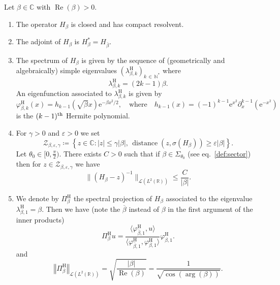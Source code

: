 \documentclass[AHL,Unicode,longabstracts,published]{cedram}
\newcommand{\abs}[1]{\left\vert #1\right\vert}
\newcommand{\nr}[1]{\left\Vert #1\right\Vert}
\renewcommand{\leq}{\leqslant}
\renewcommand{\geq}{\geqslant}
\newcommand{\inv}{^{-1}}
\newcommand{\1}{\mathds 1}
\DeclareMathOperator{\Ree}{Re}
\DeclareMathOperator{\distance}{distance}
\newcommand{\R}{\mathbb{R}}
\newcommand{\C}{\mathbb{C}}
\newcommand{\N}{\mathbb{N}}
\newcommand{\Lc}{{\mathcal L}}
\newcommand{\Zc}{\mathcal Z}
\newcommand{\eu}{\mathrm e}
\newcommand{\He}{h}
\newcommand{\sector}[1][\theta_0]{\Sigma_{#1}}
\newcommand{\h}{{\mathrm{H}}}
\renewcommand{\b}{\beta}
\newcommand{\g}{\gamma}
\newcommand{\e}{\varepsilon}
\renewcommand{\th}{\theta}
\renewcommand{\l}{\lambda}
\newcommand{\f}{\varphi}
\newcommand*{\romanenumi}{\renewcommand*{\theenumi}{\roman{enumi}}}
\DeclareMathOperator{\Ree}{Re}
\begin{document}
\break
\begin{prop}\label{prop:Davies}
Let $\b \in \C$ with $\Ree(\b) > 0$.
\begin{enumerate}\romanenumi
\item The operator $H_\b$ is closed and has compact resolvent.


\item The adjoint of $H_\b$ is $H_\b^* = H_{\bar \b}$.

\item The spectrum of $H_\beta$ is given by the sequence of (geometrically and algebraically) simple eigenvalues $(\l_{\b,k}^\h)_{k\,\in\,\N^*}$ where
\[
\l_{\b,k}^\h = (2k-1) \beta.
\]
An eigenfunction associated to $\l_{\b,k}^\h$ is given by
\[
\f_{\b,k}^\h(x) = \He_{k-1}\left(\sqrt \b x\right)\eu^{-\b x^2\!/2}, \quad \text{where} \quad \He_{k-1}(x) = (-1)^{k-1}\eu^{x^2}\partial_x^{k-1}\left(\eu^{-x^2}\right)
\]
is the $(k-1)^{\rm th}$ Hermite polynomial.

\item For $\g > 0$ and $\e > 0$ we set
\begin{equation}\label{def:Zc-beta}
\Zc_{\b,\e,\g} \coloneqq \left\{ z \in \C \colon \abs z \leq \g \abs \beta, \, \distance (z,\sigma(H_\beta)) \geq \e \abs \b\right\}.
\end{equation}
Let $\th_0 \in [0,\frac \pi 2)$. There exists $C > 0$ such that if $\beta \in \sector$ (see eq.~\eqref{def:sector}) then for $z \in \Zc_{\b,\e,\g}$ we have
\begin{equation}\label{eq:res-Hb}
\big\| \left(H_\beta - z\right)\inv \big\|_{\Lc\left(L^2(\R)\right)} \leq \frac C {\abs \beta}.
\end{equation}

\item We denote by $\Pi_{\b}^\h$ the spectral projection of $H_\b$ associated to the eigenvalue $\l_{\b,1}^\h = \b$. Then we have (note the $\overline \beta$ instead of $\beta$ in the first argument of the inner products)
\begin{equation}\label{eq:eigenproj-Hb-formula}
\Pi_\b^\h u = \frac {\big\langle \f_{\bar \b,1}^\h,u \big\rangle} {\big\langle \f_{\bar \b,1}^\h, \f_{\b,1}^\h \big\rangle} \f_{\b,1}^\h.
\end{equation}
and
\begin{equation}\label{eq:eigenproj-Hb}
\nr{\Pi_\b^\h}_{\Lc(L^2(\R))} = \sqrt{\frac {\abs \b}{\Ree(\b)}} = \frac 1 {\sqrt{\cos(\arg(\b))}}.
\end{equation}
\end{enumerate}
\end{prop}
\end{document}

